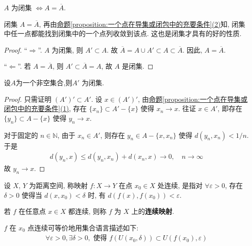 \documentclass[../../main.tex]{subfiles}
\begin{document}
\begin{theorem}
$A$ 为闭集 $\Leftrightarrow A = \overline{A}$.
\end{theorem}
\begin{remark}
闭集 $A = \overline{A}$, 再由\hyperref[proposition:一个点在导集或闭包中的充要条件]{命题\ref{proposition:一个点在导集或闭包中的充要条件}(2)}知, 闭集中任一点都能找到闭集中的一个点列收敛到该点. 这也是闭集才具有的好的性质.
\end{remark}
\begin{proof}
“$\Rightarrow$”. $A$ 为闭集, 则 $A' \subset A$. 故 $\overline{A} = A \cup A' \subset A \subset \overline{A}$. 因此, $A = \overline{A}$.

“$\Leftarrow$”. 若 $A = \overline{A}$, 则 $A' \subset \overline{A} = A$, 故 $A$ 是闭集.
\end{proof}

\begin{theorem}
设$A$为一个非空集合,则$A'$ 为闭集.
\end{theorem}
\begin{proof}
只需证明 $(A')' \subset A'$. 设 $x \in (A')'$, 由\hyperref[proposition:一个点在导集或闭包中的充要条件]{命题\ref{proposition:一个点在导集或闭包中的充要条件}(1)}, 存在 $\{x_n\} \subset A' - \{x\}$ 使得 $x_n \to x$. 往证 $x \in A'$, 即存在 $\{y_n\} \subset A - \{x\}$ 使得 $y_n \to x$.

对于固定的 $n \in \mathbb{N}$, 由于 $x_n \in A'$, 则存在 $y_n \in A - \{x, x_n\}$ 使得 $d(y_n, x_n) < 1/n$. 于是
\begin{align*}
d(y_n, x) \leqslant d(y_n, x_n) + d(x_n, x) \to 0, \quad n \to \infty
\end{align*}
故 $y_n \to x$.
\end{proof}

\begin{definition}[连续映射]
设 $X$, $Y$ 为距离空间, 称映射 $f : X \to Y$ 在点 $x_0 \in X$ 处连续, 是指对 $\forall \varepsilon > 0$, 存在 $\delta > 0$ 使得当 $d(x, x_0) < \delta$ 时, 有 $d(f(x), f(x_0)) < \varepsilon$.

若 $f$ 在任意点 $x \in X$ 都连续, 则称 $f$ 为 $X$ 上的\textbf{连续映射}.
\end{definition}
\begin{remark}
$f$ 在 $x_0$ 点连续可等价地用集合语言描述如下:
\begin{align*}
\forall \varepsilon > 0, \exists \delta > 0, \text{ 使得 } f(U(x_0, \delta)) \subset U(f(x_0), \varepsilon)
\end{align*}
\end{remark}
\end{document}
